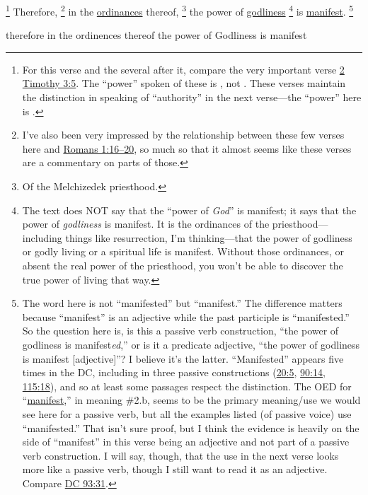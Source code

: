 			\footnote{%
				For this verse and the several after it, compare the very important verse \hyperref[2TIMOTHY-3-5]{2 Timothy 3:5}. The ``power'' spoken of these is \hyperref[DUNAMIS]{}, not \hyperref[EXOUSIA]{}. These verses maintain the distinction in speaking of ``authority'' in the next verse---the ``power'' here is .
				}%
		Therefore,
		\footnote{%
			I've also been very impressed by the relationship between these few verses here and \hyperref[ROMAN-1-16]{Romans 1:16--20}, so much so that it almost seems like these verses are a commentary on parts of those.
			}%
		in the \hyperref[ORDINANCE]{ordinances} thereof,%
			\footnote{%
				Of the Melchizedek priesthood.
				}
		the power of \hyperref[GODLINESS]{godliness}%
			\footnote{%
				The text does NOT say that the ``power of \textit{God}'' is manifest; it says that the power of \textit{godliness} is manifest. It is the ordinances of the priesthood---including things like resurrection, I'm thinking---that the power of godliness or godly living or a spiritual life is manifest. Without those ordinances, or absent the real power of the priesthood, you won't be able to discover the true power of living that way.
				}
		is \hyperref[MANIFEST]{manifest}.%
			\footnote{%
				The word here is not ``manifested'' but ``manifest.'' The difference matters because ``manifest'' is an adjective while the past participle is ``manifested.'' So the question here is, is this a passive verb construction, ``the power of godliness is manifest\textit{ed},'' or is it a predicate adjective, ``the power of godliness is manifest [adjective]''? I believe it's the latter. ``Manifested'' appears five times in the DC, including in three passive constructions (\hyperref[DC20-5]{20:5}, \hyperref[DC90-14]{90:14}, \hyperref[DC115-18]{115:18}), and so at least some passages respect the distinction. The OED for ``\hyperref[MANIFEST-OED]{manifest},'' in meaning \#2.b, seems to be the primary meaning/use we would see here for a passive verb, but all the examples listed (of passive voice) use ``manifested.'' That isn't sure proof, but I think the evidence is heavily on the side of ``manifest'' in this verse being an adjective and not part of a passive verb construction. I will say, though, that the use in the next verse looks more like a passive verb, though I still want to read it as an adjective. Compare \hyperref[DC93-31]{DC 93:31}.
				}

		\begin{framed}
		\scriptsize
			\begin{compactdesc}
				\item[JSP] therefore in the ordinences thereof the power of Godliness is manifest
			\end{compactdesc}
		\end{framed}

